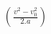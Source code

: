 \documentclass[preview]{standalone}
\begin{document}
\begin{align*}
\left(\frac{v^2 - v^{2}_0}{2.a}\right)
\end{align*}
\end{document}
